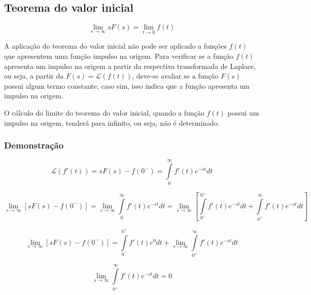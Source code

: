 \documentclass[12pt,fleqn]{book} %
\begin{document}
    \subsection{Teorema do valor inicial}
        \begin{theorem}
        \begin{equation}
        \lim_{s\rightarrow\infty}sF(s) = \lim_{t\rightarrow0}f(t)
        \end{equation}
        \end{theorem}
        
        A aplicação do teorema do valor inicial não pode ser aplicado a funções $f(t)$ que apresentem uma função impulso na origem. Para verificar se a função $f(t)$ apresenta um impulso na origem a partir da respectiva transformada de Laplace, ou seja, a partir da $F(s)=\mathscr{L}(f(t))$, deve-se avaliar se a função $F(s)$ possui algum termo constante, caso sim, isso indica que a função apresenta um impulso na origem.
        
        O cálculo do limite do teorema do valor inicial, quando a função $f(t)$ possui um impulso na origem, tenderá para infinito, ou seja, não é determinado.
        
        \subsubsection{Demonstração}
        
        \begin{equation}
        \mathscr{L}(f'(t)) = sF(s)-f(0^-) = \int\limits_{0}^{\infty}f'(t)e^{-st}dt
        \end{equation}
        
\begin{equation}
\lim_{s\rightarrow\infty}[sF(s)-f(0^-)] = \lim_{s\rightarrow\infty}\int\limits_{0}^{\infty}f'(t)e^{-st}dt = \lim_{s\rightarrow\infty}[\int\limits_{0^-}^{0^+}f'(t)e^{-st}dt+\int\limits_{0^+}^{\infty}f'(t)e^{-st}dt]
\end{equation}        
    
\begin{equation}
\lim_{s\rightarrow\infty}[sF(s)-f(0^-)] = \int\limits_{0^-}^{0^+}f'(t)e^{0}dt + \lim_{s\rightarrow\infty}\int\limits_{0^+}^{\infty}f'(t)e^{-st}dt
\end{equation} 

\begin{equation}
\lim_{s\rightarrow\infty}\int\limits_{0^+}^{\infty}f'(t)e^{-st}dt = 0
\end{equation}   
\end{document}
